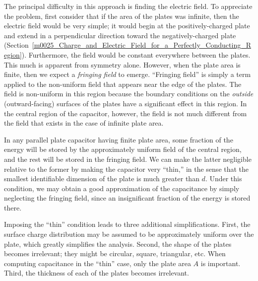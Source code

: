 The principal difficulty in this approach is finding the electric field. 
To appreciate the problem, first consider that if the area of the plates was infinite, then the electric field would be very simple; it would begin at the positively-charged plate and extend in a perpendicular direction toward the negatively-charged plate (Section~\ref{m0025_Charge_and_Electric_Field_for_a_Perfectly_Conducting_Region}).  Furthermore, the field would be constant everywhere between the plates.  This much is apparent from symmetry alone.
However, when the plate area is finite, then we expect a \emph{fringing field} 
to emerge.  ``Fringing field'' is simply a term applied to the non-uniform field that appears near the edge of the plates. The field is non-uniform in this region because the boundary conditions on the \emph{outside} (outward-facing) surfaces of the plates have a significant effect in this region. 
In the central region of the capacitor, however, the field is not much different from the field that exists in the case of infinite plate area.

In any parallel plate capacitor having finite plate area, some fraction of the energy will be stored by the approximately uniform field of the central region, and the rest will be stored in the fringing field.  We can make the latter negligible relative to the former by making the capacitor very ``thin,'' in the sense that the smallest identifiable dimension of the plate is much greater than $d$.  
Under this condition, we may obtain a good approximation of the capacitance by simply neglecting the fringing field, since an insignificant fraction of the energy is stored there.

Imposing the ``thin'' condition leads to three additional simplifications.  
First, the surface charge distribution may be assumed to be approximately uniform over the plate, which greatly simplifies the analysis.
Second, the shape of the plates becomes irrelevant; they might be circular, square, triangular, etc. 
When computing capacitance in the ``thin'' case, only the plate area $A$ is important. 
Third, the thickness of each of the plates becomes irrelevant.


